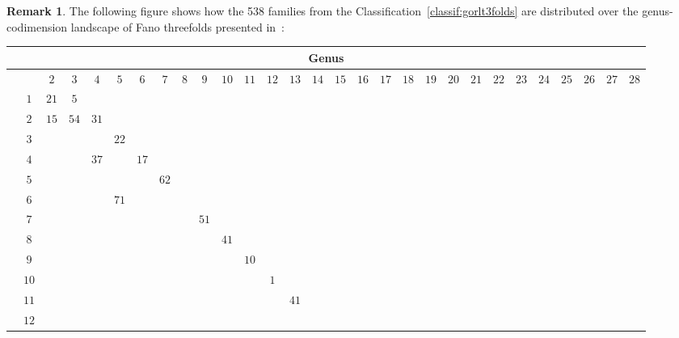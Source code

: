 \documentclass[10pt,a4paper]{amsart}
\theoremstyle{definition}
\newtheorem{rema}[thm]{Remark}
\numberwithin{equation}{section}
\begin{document}
\begin{rema}
The following figure shows how the 538 families from
the Classification~\ref{classif:gorlt3folds} are
distributed over the genus-codimension landscape of
Fano threefolds presented in~\cite[Figure~1]{BrKa}:\vspace{-5ex}
\begin{table}[h!]\centering
\small\setlength{\tabcolsep}{1.5pt} \setlength{\arraycolsep}{0pt}
	\begin{longtable}{c|c|ccccc|ccccc|ccccc|ccccc|ccccc|cc}\hline
	\multicolumn{29}{c}{Genus}
	\\ \hline
	\multirow{24}{*}{\rotatebox[origin=c]{90}{Codimension}}
\qquad	& &${ 2}$ &${ 3}$ &${ 4}$ &${ 5}$ &${ 6}$ & ${ 7}$ &${ 8}$ &${ 9}$ &${ 10}$ &${ 11}$ &${ 12}$ &${ 13}$ &${ 14}$ &${ 15}$ &${ 16}$ &${ 17}$ &${ 18}$ &${ 19}$ &${ 20}$ &${ 21}$ &${ 22}$ &${ 23}$ &${ 24}$ &${ 25}$ &${ 26}$ &${ 27}$ &${ 28}$
	\\
	\cline{2-29}
	&${ 1}$ & \hyperref[T(1,2)]{${ 21}$} &\hyperref[T(1,3)]{${ 5}$} & & & & & & & & & & & & & & & & & & & & & & & & &
	\\
	&${ 2}$ &\hyperref[T(2,2)]{${ 15}$} & \hyperref[T(2,3)]{${ 54}$} & \hyperref[T(2,4)]{${ 31}$} & & & & & & & & & & & & & & & & & & & & & & & &
	\\
	&${ 3}$ & & & & \hyperref[T(3,5)]{${ 22}$} & & & & & & & & & & & & & & & & & & & & & & &
	\\
	&${ 4}$ & & & \hyperref[T(4,4)]{${ 37}$} & & \hyperref[T(4,6)]{${ 17}$} & & & & & & & & & & & & & & & & & & & & & &
	\\
	&${ 5}$ & & & & & & \hyperref[T(5,7)]{${ 62}$} & & & & & & & & & & & & & & & & & & & & &
	\\
	&${ 6}$ & & & & \hyperref[T(6,5)]{${ 71}$} & & & & & & & & & & & & & & & & & & & & & & &
	\\
	&${ 7}$ & & & & & & & & \hyperref[T(7,9)]{${ 51}$} & & & & & & & & & & & & & & & & & & &
	\\
	\cline{2-29}
	&${ 8}$ & & & & & & & & & \hyperref[T(8,10)]{${ 41}$} & & & & & & & & & & & & & & & & & &
	\\
	&${ 9}$ & & & & & & & & & & \hyperref[T(9,11)]{${ 10}$} & & & & & & & & & & & & & & & & &
	\\
	&${ 10}$ & & & & & & & & & & & \hyperref[T(10,12)]{${ 1}$} & & & & & & & & & & & & & & & &
	\\
	&${ 11}$ & & & & & & & & & & & & \hyperref[T(11,13)]{${ 41}$} & & & & & & & & & & & & & & &
	\\
	&${ 12}$ & & & & & & & & & & & & & & & & & & & & & & & & & & &

\end{longtable}
\end{table}
\end{rema}
\end{document}
